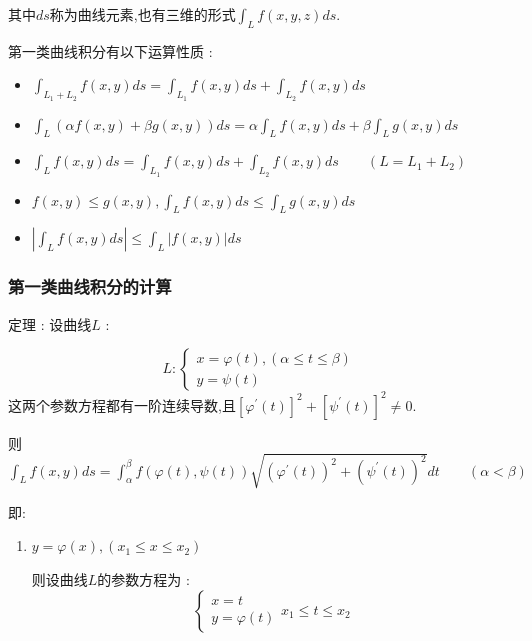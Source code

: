 \documentclass[UTF8,12pt]{ctexbook}
\newcommand{\derivative}{^\prime}
\newcommand{\defFunction}[1]{f(#1)}
\newcommand{\definiteIntegral}[2]{\int^{#1}_{#2}}
\newcommand{\absoluteValue}[1]{\left\lvert #1 \right\vert}
\newcommand{\pathIntegral}[1]{\int_{#1}}
\begin{document}
{{{{    其中$ds$称为曲线元素,也有三维的形式$\pathIntegral{L}\defFunction{x,y,z}ds$.

    第一类曲线积分有以下运算性质 :
    \begin{itemize}
      \item $\pathIntegral{L_1 + L_2}\defFunction{x,y}ds = \pathIntegral{L_1}\defFunction{x,y}ds + \pathIntegral{L_2}\defFunction{x,y}ds$
      \item $\pathIntegral{L}(\alpha\defFunction{x,y} + \beta g(x,y))ds = \alpha\pathIntegral{L}\defFunction{x,y}ds + \beta\pathIntegral{L}g(x,y)ds$
      \item $\pathIntegral{L}\defFunction{x,y}ds = \pathIntegral{L_1}\defFunction{x,y}ds + \pathIntegral{L_2}\defFunction{x,y}ds \qquad (L = L_1 + L_2)$
      \item $\defFunction{x,y} \leq g(x,y),\pathIntegral{L}\defFunction{x,y}ds \leq \pathIntegral{L}g(x,y)ds$
      \item $\absoluteValue{\pathIntegral{L}\defFunction{x,y}ds} \leq \pathIntegral{L}\absoluteValue{\defFunction{x,y}}ds$
    \end{itemize}
  }%

  \subsubsection{第一类曲线积分的计算}{
    定理 : 设曲线$L$ :
    \begin{center}
      $$
        L :
        \begin{cases}
          x = \varphi(t),(\alpha \leq t \leq \beta) \\
          y = \psi(t)
        \end{cases}
      $$
      这两个参数方程都有一阶连续导数,且$\left[\varphi\derivative(t)\right]^2 + \left[\psi\derivative(t)\right]^2 \neq 0$.
    \end{center}

    则$\pathIntegral{L}\defFunction{x,y}ds = \definiteIntegral{\beta}{\alpha}\defFunction{\varphi(t),\psi(t)}\sqrt{(\varphi\derivative(t))^2 + (\psi\derivative(t))^2}dt\qquad (\alpha < \beta)$

    即:
    \begin{enumerate}
      \item {
            $y = \varphi(x),(x_1 \leq x \leq x_2)$

            则设曲线$L$的参数方程为 :
            $$
              \begin{cases}
                x = t \\
                y = \varphi(t)
              \end{cases}
              x_1 \leq t \leq x_2
            $$

}
\end{enumerate}}}}}
\end{document}
